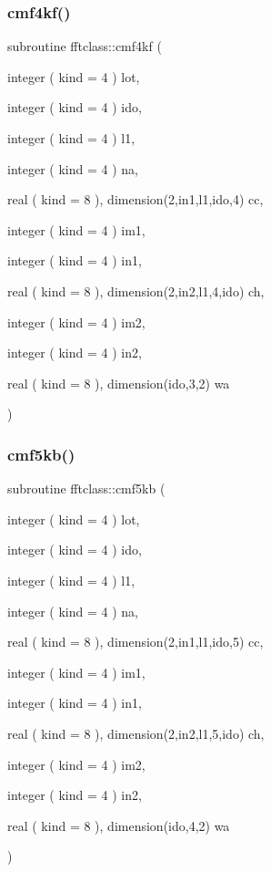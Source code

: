 \mbox{\label{namespacefftclass_acdd67c6a77ecec55c036ab8899c07dee}} 
\subsubsection{\texorpdfstring{cmf4kf()}{cmf4kf()}}
{\footnotesize\ttfamily subroutine fftclass\+::cmf4kf (\begin{DoxyParamCaption}\item[{integer ( kind = 4 )}]{lot,  }\item[{integer ( kind = 4 )}]{ido,  }\item[{integer ( kind = 4 )}]{l1,  }\item[{integer ( kind = 4 )}]{na,  }\item[{real ( kind = 8 ), dimension(2,in1,l1,ido,4)}]{cc,  }\item[{integer ( kind = 4 )}]{im1,  }\item[{integer ( kind = 4 )}]{in1,  }\item[{real ( kind = 8 ), dimension(2,in2,l1,4,ido)}]{ch,  }\item[{integer ( kind = 4 )}]{im2,  }\item[{integer ( kind = 4 )}]{in2,  }\item[{real ( kind = 8 ), dimension(ido,3,2)}]{wa }\end{DoxyParamCaption})}

\mbox{\label{namespacefftclass_a4bf0caaf1c5caeb50490706cd35d82c5}} 
\subsubsection{\texorpdfstring{cmf5kb()}{cmf5kb()}}
{\footnotesize\ttfamily subroutine fftclass\+::cmf5kb (\begin{DoxyParamCaption}\item[{integer ( kind = 4 )}]{lot,  }\item[{integer ( kind = 4 )}]{ido,  }\item[{integer ( kind = 4 )}]{l1,  }\item[{integer ( kind = 4 )}]{na,  }\item[{real ( kind = 8 ), dimension(2,in1,l1,ido,5)}]{cc,  }\item[{integer ( kind = 4 )}]{im1,  }\item[{integer ( kind = 4 )}]{in1,  }\item[{real ( kind = 8 ), dimension(2,in2,l1,5,ido)}]{ch,  }\item[{integer ( kind = 4 )}]{im2,  }\item[{integer ( kind = 4 )}]{in2,  }\item[{real ( kind = 8 ), dimension(ido,4,2)}]{wa }\end{DoxyParamCaption})}

